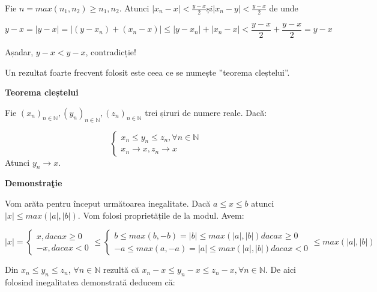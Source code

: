 \documentclass[a4paper,12pt,oneside]{report}
\begin{document}
Fie \(n = max (n _{1}, n_{2}) \geq n_{1}, n_{2}.\) Atunci \(\left | x_{n} - x \right | < \frac{y-x}{2} și \left | x_{n} - y  \right | <  \frac{y-x}{2}\) de unde 

\begin{displaymath}
  y-x = \left | y-x \right | = \left | (y-x_{n})+ (x_{n} -x) \right |\leq \left | y-x_{n} \right | + \left | x_{n} - x \right | < \frac{y-x}{2} + \frac{y-x}{2} = y-x
\end{displaymath}


Așadar, \(y-x < y-x\), contradicție!

Un rezultat foarte frecvent folosit este ceea ce se numește ”teorema cleștelui”.

\textbf{Teorema cleștelui}

Fie \((x_{n})_{n\in \mathbb{N}}, (y_{n})_{n\in \mathbb{N}},(z_{n})_{n\in \mathbb{N}} \) trei șiruri de numere reale. 
Dacă:

\[\left\{\begin{matrix}
x_{n} \leq  y_{n} \leq z_{n}, \forall  n \in \mathbb{N}\\ 
x_{n} \to x, z_{n} \rightarrow x

\end{matrix}\right. \]
Atunci \(y_{n} \to x\).

\textbf{Demonstra\c tie}

Vom arăta pentru început următoarea inegalitate. Dacă \(a \leq x\leq b\) atunci \(\left | x \right | \leq  max (\left | a \right |, \left | b \right |) \). 
Vom folosi proprietățile de la modul. Avem:

\begin{displaymath}
  \left | x \right | = \left\{\begin{matrix} x, daca x \geq 0\\ -x, daca x< 0 \end{matrix}\right. \leq \left\{\begin{matrix} b\leq max(b,-b) = \left | b \right |\leq max(\left | a \right |,\left | b \right |) daca x\geq 0\\  -a\leq max(a,-a) = \left | a \right | \leq max (\left | a \right |,\left | b \right |) daca x< 0 \end{matrix}\right. \leq max (\left | a \right |, \left | b \right |)
\end{displaymath}
 

Din \(x_{n} \leq y_{n}\leq z_{n}\), \(\forall n\in \mathbb{N} \) rezultă că \(x_{n}-x \leq y_{n}-x \leq z_{n}-x, \forall n\in \mathbb{N}. \)
De aici folosind inegalitatea demonstrată deducem că:
\end{document}
